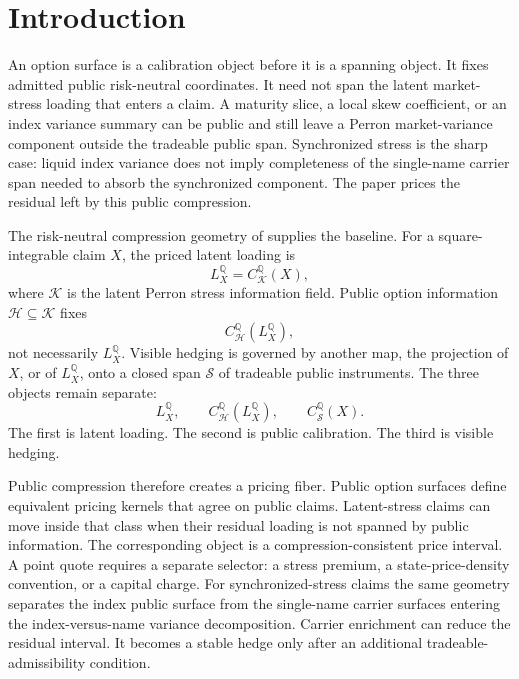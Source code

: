 \documentclass[11pt,a4paper]{amsart}
\theoremstyle{plain}
\theoremstyle{definition}
\theoremstyle{remark}
\newcommand{\QQ}{\mathbb{Q}}
\newcommand{\cH}{\mathcal{H}}
\newcommand{\cK}{\mathcal{K}}
\newcommand{\cS}{\mathcal{S}}
\begin{document}
\maketitle

\section{Introduction}\label{sec:intro}

An option surface is a calibration object before it is a spanning object.  It fixes admitted public
risk-neutral coordinates.  It need not span the latent market-stress loading that enters a claim.
A maturity slice, a local skew coefficient, or an index variance summary can be public and still
leave a Perron market-variance component outside the tradeable public span.  Synchronized stress is
the sharp case: liquid index variance does not imply completeness of the single-name carrier span
needed to absorb the synchronized component.  The paper prices the residual left by this public
compression.

The risk-neutral compression geometry of \cite{vidal2026compression} supplies the baseline.  For a
square-integrable claim \(X\), the priced latent loading is
\[
        L_X^\QQ=C_{\cK}^{\QQ}(X),
\]
where \(\cK\) is the latent Perron stress information field.  Public option information
\(\cH\subseteq\cK\) fixes
\[
        C_{\cH}^{\QQ}(L_X^\QQ),
\]
not necessarily \(L_X^\QQ\).  Visible hedging is governed by another map, the projection of
\(X\), or of \(L_X^\QQ\), onto a closed span \(\cS\) of tradeable public instruments.  The three
objects remain separate:
\[
        L_X^\QQ,
        \qquad
        C_{\cH}^{\QQ}(L_X^\QQ),
        \qquad
        C_{\cS}^{\QQ}(X).
\]
The first is latent loading.  The second is public calibration.  The third is visible hedging.

Public compression therefore creates a pricing fiber.  Public option surfaces define equivalent
pricing kernels that agree on public claims.  Latent-stress claims can move inside that class when
their residual loading is not spanned by public information.  The corresponding object is a
compression-consistent price interval.  A point quote requires a separate selector: a stress
premium, a state-price-density convention, or a capital charge.  For synchronized-stress claims the
same geometry separates the index public surface from the single-name carrier surfaces entering the
index-versus-name variance decomposition.  Carrier enrichment can reduce the residual interval.  It
becomes a stable hedge only after an additional tradeable-admissibility condition.
\end{document}
